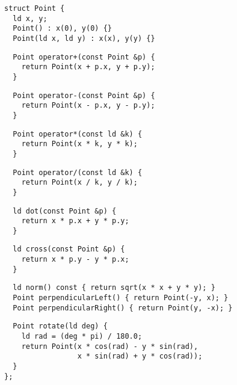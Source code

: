 \documentclass[twoside]{article}
\begin{document}
\begin{multicols*}{2}
\begin{verbatim}
struct Point {
  ld x, y;
  Point() : x(0), y(0) {}
  Point(ld x, ld y) : x(x), y(y) {}
\end{verbatim}
\vspace{-12pt}
\begin{verbatim}
  Point operator+(const Point &p) {
    return Point(x + p.x, y + p.y);
  }
\end{verbatim}
\vspace{-12pt}
\begin{verbatim}
  Point operator-(const Point &p) {
    return Point(x - p.x, y - p.y);
  }
\end{verbatim}
\vspace{-12pt}
\begin{verbatim}
  Point operator*(const ld &k) {
    return Point(x * k, y * k);
  }
\end{verbatim}
\vspace{-12pt}
\begin{verbatim}
  Point operator/(const ld &k) {
    return Point(x / k, y / k);
  }
\end{verbatim}
\vspace{-12pt}
\begin{verbatim}
  ld dot(const Point &p) {
    return x * p.x + y * p.y;
  }
\end{verbatim}
\vspace{-12pt}
\begin{verbatim}
  ld cross(const Point &p) {
    return x * p.y - y * p.x;
  }
\end{verbatim}
\vspace{-12pt}
\begin{verbatim}
  ld norm() const { return sqrt(x * x + y * y); }
  Point perpendicularLeft() { return Point(-y, x); }
  Point perpendicularRight() { return Point(y, -x); }
\end{verbatim}
\vspace{-12pt}
\begin{verbatim}
  Point rotate(ld deg) {
    ld rad = (deg * pi) / 180.0;
    return Point(x * cos(rad) - y * sin(rad),
                 x * sin(rad) + y * cos(rad));
  }
};
\end{verbatim}

\subsectionfont{\bfseries\sffamily\centering\LARGE}
\vspace{0em}

\end{multicols*}
\end{document}
